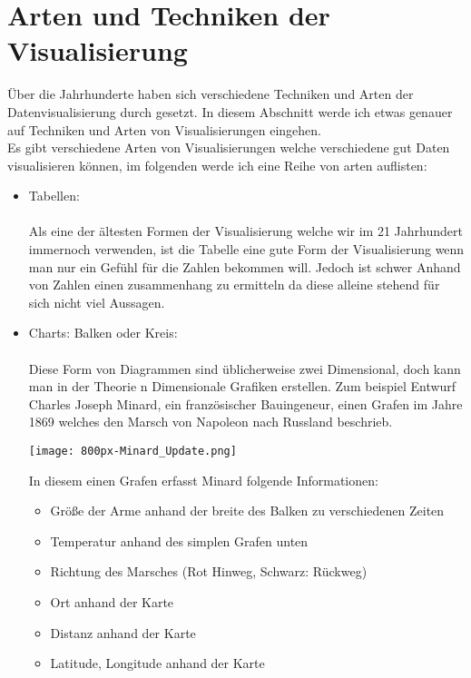 \section{Arten und Techniken der Visualisierung}
Über die Jahrhunderte haben sich verschiedene Techniken und Arten der Datenvisualisierung durch gesetzt. In diesem Abschnitt werde ich etwas
genauer auf Techniken und Arten von Visualisierungen eingehen. \\
Es gibt verschiedene Arten von Visualisierungen welche verschiedene gut Daten visualisieren können, im folgenden werde ich eine Reihe von
arten auflisten:
\begin{itemize}
    \item{Tabellen:} \\ \\
        Als eine der ältesten Formen der Visualisierung welche wir im 21 Jahrhundert immernoch verwenden, ist die Tabelle eine gute Form der
        Visualisierung wenn man nur ein Gefühl für die Zahlen bekommen will. Jedoch ist schwer Anhand von Zahlen einen zusammenhang zu
        ermitteln da diese alleine stehend für sich nicht viel Aussagen.
    \item{Charts: Balken oder Kreis: } \\ \\
        Diese Form von Diagrammen sind üblicherweise zwei Dimensional, doch kann man in der Theorie n Dimensionale Grafiken erstellen. Zum
        beispiel Entwurf Charles Joseph Minard, ein französischer Bauingeneur, einen Grafen im Jahre 1869 welches den Marsch von Napoleon
        nach Russland beschrieb.\cite{bestvisualizations}
        \begin{center}
            \texttt{[image: 800px-Minard\_Update.png]}\cite{minardgraph}
        \end{center}
        In diesem einen Grafen erfasst Minard folgende Informationen:
        \begin{itemize}
            \item Größe der Arme anhand der breite des Balken zu verschiedenen Zeiten
            \item Temperatur anhand des simplen Grafen unten
            \item Richtung des Marsches (Rot Hinweg, Schwarz: Rückweg) 
            \item Ort anhand der Karte
            \item Distanz anhand der Karte
            \item Latitude, Longitude anhand der Karte

\end{itemize}
\end{itemize}
